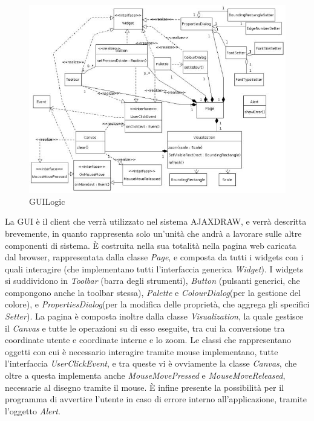 \begin{figure}[!ht]
\centering
\includegraphics{GUIlogic.jpg}
\caption{GUILogic}
\end{figure}
La GUI \` e  il client che verr\` a utilizzato nel sistema AJAXDRAW, e verr\` a descritta brevemente, in quanto rappresenta solo un'unit\` a che andr\`  a a lavorare sulle altre componenti di sistema. \` E costruita nella sua totalit\` a nella pagina web caricata dal browser, rappresentata dalla classe \textit{Page}, e composta da tutti i widgets con i quali interagire (che implementano tutti l'interfaccia generica \textit{Widget}).  I widgets si suddividono in \textit{Toolbar} (barra degli strumenti), \textit{Button} (pulsanti generici, che compongono anche la toolbar stessa), \textit{Palette} e \textit{ColourDialog}(per la gestione del colore), e \textit{PropertiesDialog}(per la modifica delle propriet\` a, che aggrega gli specifici \textit{Setter}). La pagina \` e composta inoltre dalla classe \textit{Visualization}, la quale gestisce il \textit{Canvas} e tutte le operazioni su di esso eseguite, tra cui la conversione tra coordinate utente e coordinate interne e lo zoom. Le classi che rappresentano oggetti con cui \`e necessario interagire tramite mouse implementano, tutte l'interfaccia \textit{UserClickEvent}, e tra queste vi \` e ovviamente la classe \textit{Canvas}, che oltre a questa implementa anche \textit{MouseMovePressed} e \textit{MouseMoveReleased}, necessarie al disegno tramite il mouse.  \` E infine presente la possibilit\` a per il programma di avvertire l'utente in caso di errore interno all'applicazione, tramite l'oggetto \textit{Alert}. \\ \\ \\

